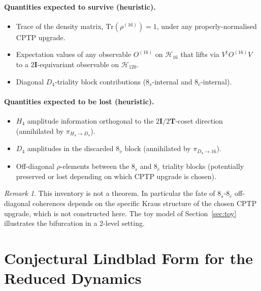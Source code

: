 \documentclass[12pt]{article}
\theoremstyle{definition}
\theoremstyle{remark}
\newtheorem{remark}[theorem]{Remark}
\newcommand{\Hcal}{\mathcal{H}}
\newcommand{\Tr}{\mathrm{Tr}}
\newcommand{\twoI}{2\mathbf{I}}
\newcommand{\twoT}{2\mathbf{T}}
\begin{document}
\paragraph{Quantities expected to survive (heuristic).}
\begin{itemize}
\item Trace of the density matrix, $\Tr(\rho^{(16)}) = 1$, under any properly-normalised CPTP upgrade.
\item Expectation values of any observable $O^{(16)}$ on $\Hcal_{16}$ that lifts via $V^\dagger O^{(16)} V$ to a $\twoI$-equivariant observable on $\Hcal_{120}$.
\item Diagonal $D_4$-triality block contributions ($8_s$-internal and $8_c$-internal).
\end{itemize}

\paragraph{Quantities expected to be lost (heuristic).}
\begin{itemize}
\item $H_4$ amplitude information orthogonal to the $\twoI/\twoT$-coset direction (annihilated by $\pi_{H_4 \to D_4}$).
\item $D_4$ amplitudes in the discarded $8_v$ block (annihilated by $\pi_{D_4 \to 16}$).
\item Off-diagonal $\rho$-elements between the $8_s$ and $8_c$ triality blocks (potentially preserved or lost depending on which CPTP upgrade is chosen).
\end{itemize}

\begin{remark}
This inventory is not a theorem. In particular the fate of $8_s$-$8_c$ off-diagonal coherences depends on the specific Kraus structure of the chosen CPTP upgrade, which is not constructed here. The toy model of Section~\ref{sec:toy} illustrates the bifurcation in a 2-level setting.
\end{remark}

\section{Conjectural Lindblad Form for the Reduced Dynamics}\label{sec:dynamics}
\end{document}
